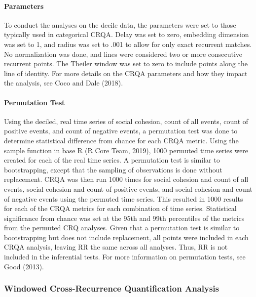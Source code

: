 \documentclass[english,man]{apa6}
\begin{document}
\hypertarget{parameters}{%
\paragraph{Parameters}\label{parameters}}

To conduct the analyses on the decile data, the parameters were set to those typically used in categorical CRQA. Delay was set to zero, embedding dimension was set to 1, and radius was set to .001 to allow for only exact recurrent matches. No normalization was done, and lines were considered two or more consecutive recurrent points. The Theiler window was set to zero to include points along the line of identity. For more details on the CRQA parameters and how they impact the analysis, see Coco and Dale (2018).

\hypertarget{permutation-test}{%
\paragraph{Permutation Test}\label{permutation-test}}

Using the deciled, real time series of social cohesion, count of all events, count of positive events, and count of negative events, a permutation test was done to determine statistical difference from chance for each CRQA metric. Using the sample function in base R (R Core Team, 2019), 1000 permuted time series were created for each of the real time series. A permutation test is similar to bootstrapping, except that the sampling of observations is done without replacement. CRQA was then run 1000 times for social cohesion and count of all events, social cohesion and count of positive events, and social cohesion and count of negative events using the permuted time series. This resulted in 1000 results for each of the CRQA metrics for each combination of time series. Statistical significance from chance was set at the 95th and 99th percentiles of the metrics from the permuted CRQ analyses. Given that a permutation test is similar to bootstrapping but does not include replacement, all points were included in each CRQA analysis, leaving RR the same across all analyses. Thus, RR is not included in the inferential tests. For more information on permutation tests, see Good (2013).

\hypertarget{windowed-cross-recurrence-quantification-analysis}{%
\subsubsection{Windowed Cross-Recurrence Quantification Analysis}\label{windowed-cross-recurrence-quantification-analysis}}
\end{document}
